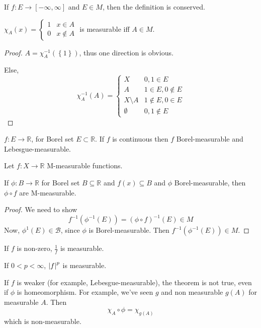 \begin{coll}
	If $f: E\to [-\infty, \infty]$ and $E\in M$, then the definition is conserved.
\end{coll}
\begin{coll}
	$\chi_A(x) = \begin{cases}
	1&x\in A\\0&x\notin A
	\end{cases}$ is measurable iff $A \in M$.
\begin{proof}
		
	$A=\chi_A^{-1}(\left\{ 1 \right\})$, thus one direction is obvious.
	
	Else,
	$$\chi_A^{-1}(A) = \begin{cases}
	X&0,1\in E\\
	A& 1\in E, 0\notin E\\
	X\setminus A & 1\notin E, 0 \in E\\
	\emptyset & 0,1\notin E
	\end{cases}$$
\end{proof}
\end{coll}

\begin{coll}
	$f: E\to \mathbb{R}$, for Borel set $E\subset \mathbb{R}$. If $f$ is continuous then $f$ Borel-measurable and Lebesgue-measurable.
\end{coll}

\begin{theorem}
	Let $f: X \to \mathbb{R}$ M-measurable functions. 
	
		If $\phi: B\to \mathbb{R}$ for Borel set $B\subseteq \mathbb{R}$ and $f(x) \subseteq B$ and $\phi$ Borel-measurable, then $\phi \circ f$ are M-measurable.
		
		\begin{proof}
			We need to show
			$$f^{-1}(\phi^{-1}(E)) = (\phi\circ f)^{-1}(E) \in M$$
			Now, $\phi^{1}(E) \in \mathcal{B}$, since $\phi$ is Borel-measurable. Then $f^{-1}(\phi^{-1}(E)) \in M$.
		\end{proof}
		\begin{coll}
			If $f$ is non-zero, $\frac{1}{f}$ is measurable.
		\end{coll}
	\begin{coll}
	If $0<p<\infty$, $\abs{f}^p$ is measurable.
\end{coll}
\end{theorem}

\begin{prop}
	If $f$ is weaker (for example, Lebesgue-measurable), the theorem is not true, even if $\phi$ is homeomorphism. For example, we've seen $g$ and non measurable $g(A)$ for measurable $A$. Then
	$$\chi_A \circ \phi = \chi_{g(A)}$$
	which is non-measurable.
\end{prop}

